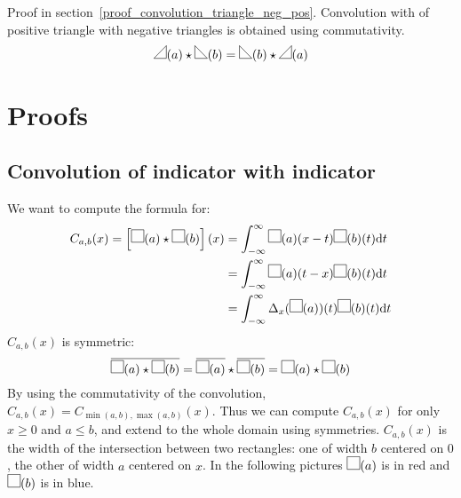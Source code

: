 \documentclass[a4paper,10pt]{article}
\newcommand\Shifted[2]{\Delta_{#1}(#2)}
\newcommand\Reversed[1]{\overline{#1}}
\newcommand\SymSquare{\begin{tikzpicture}%
        \draw (0,0) -- (0,1em) -- (1em,1em) -- (1em,0) -- cycle;
\end{tikzpicture}}
\newcommand\Indicator[1]{\SymSquare(#1)}
\newcommand\SymPositiveTriangle{\begin{tikzpicture}%
        \draw (0,0) -- (1em,0em) -- (1em,1em) -- cycle;
\end{tikzpicture}}
\newcommand\PositiveTriangle[1]{\SymPositiveTriangle(#1)}
\newcommand\SymNegativeTriangle{\begin{tikzpicture}%
        \draw (0,0) -- (0,1em) -- (1em,0em) -- cycle;
\end{tikzpicture}}
\newcommand\NegativeTriangle[1]{\SymNegativeTriangle(#1)}
\newcommand\D{\mathrm{d}}
\newcommand\Convolution{\star}
\newcommand\ConvolutionInt[2]{\int_{-\infty}^{\infty}#1 \D#2}
\begin{document}
Proof in section~\ref{proof_convolution_triangle_neg_pos}.
Convolution with of positive triangle with negative triangles is obtained using commutativity.
\[ \PositiveTriangle{a} \Convolution \NegativeTriangle{b} = \NegativeTriangle {b} \Convolution \PositiveTriangle{a} \]

\section{Proofs}

\subsection{Convolution of indicator with indicator}\label{proof_convolution_indicator_indicator}

We want to compute the formula for:
\[ \begin{split}
    C_{a,b}(x) = \left[ \Indicator{a} \Convolution \Indicator{b} \right] (x) & = \ConvolutionInt{\Indicator{a}(x-t) \Indicator{b}(t)}{t} \\
    & = \ConvolutionInt{\Indicator{a}(t-x) \Indicator{b}(t)}{t} \\
    & = \ConvolutionInt{\Shifted{x}{\Indicator{a}}(t) \Indicator{b}(t)}{t}
\end{split} \]
$C_{a,b}(x)$ is symmetric:
\[
    \Reversed{\Indicator{a} \Convolution \Indicator{b}} =
    \Reversed{\Indicator{a}} \Convolution \Reversed{\Indicator{b}} =
    \Indicator{a} \Convolution \Indicator{b}
\]
By using the commutativity of the convolution, $C_{a,b}(x) = C_{\min(a,b),\max(a,b)}(x)$.
Thus we can compute $C_{a,b}(x)$ for only $x \ge 0$ and $a \le b$, and extend to the whole domain using symmetries.
$C_{a,b}(x)$ is the width of the intersection between two rectangles: one of width $b$ centered on $0$, the other of width $a$ centered on $x$.
In the following pictures $\Indicator{a}$ is in red and $\Indicator{b}$ is in blue.
\end{document}
